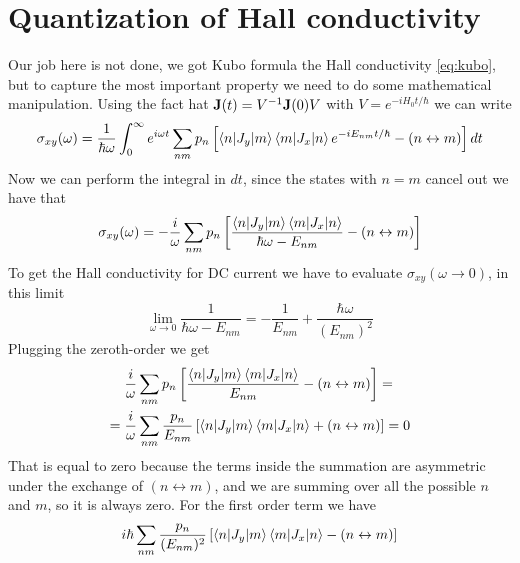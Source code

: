 \section{Quantization of Hall conductivity}
Our job here is not done, we got Kubo formula the Hall conductivity \ref{eq:kubo}, but to capture the most important property we need to do some mathematical manipulation. Using the fact hat $\mathbf{J}(t)=V^{-1}\mathbf{J}(0) V$ with $V=e^{-iH_0t/\hbar}$ we can write
\[
    \sigma_{xy}(\omega)=\frac 1{\hbar \omega}\int_0^{\infty}e^{i\omega t}\sum_{nm}p_n
    \left[
        \braket{n|J_y}{m}\braket{m|J_x}{n}e^{-iE_{nm}t/\hbar}-(n\leftrightarrow m) %
    \right]
    dt
\]
Now we can perform the integral in $dt$, since the states with $n=m$ cancel out we have that
\begin{equation}
    \sigma_{xy}(\omega)=-\frac i\omega \sum_{nm}p_n\left[
        \frac{\braket{n|J_y}{m}\braket{m|J_x}{n}}{\hbar \omega - E_{nm}} - (n\leftrightarrow m)
    \right]
\end{equation}
To get the Hall conductivity for DC current we have to evaluate $\sigma_{xy}(\omega\to 0)$, in this limit
\[
    \lim_{\omega\to 0}\frac{1}{\hbar \omega-E_{nm}}=-\frac 1{E_{nm}}+\frac{\hbar \omega}{(E_{nm})^2}    
\]
Plugging the zeroth-order we get
\begin{equation}
    \begin{split}
    \frac i\omega& \sum_{nm}p_n\left[
        \frac{\braket{n|J_y}{m}\braket{m|J_x}{n}}{E_{nm}} - (n\leftrightarrow m)
    \right]= \\
    =\frac i\omega &\sum_{nm}\frac{p_n}{E_{nm}}\left[
        \braket{n|J_y}{m}\braket{m|J_x}{n} + (n\leftrightarrow m)
    \right]=0
    \end{split}
\end{equation}
That is equal to zero because the terms inside the summation are asymmetric under the exchange of $(n\leftrightarrow m)$, and we are summing over all the possible $n$ and $m$, so it is always zero. For the first order term we have
\begin{equation}
    i\hbar\sum_{nm}\frac{p_n}{(E_{nm})^2}\left[
        \braket{n|J_y}{m}\braket{m|J_x}{n} - (n\leftrightarrow m)
    \right]
\end{equation}


